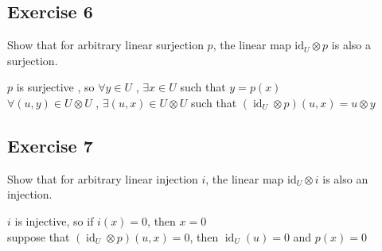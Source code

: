 \documentclass[11pt]{ctexart}
\theoremstyle{definition}
\numberwithin{equation}{section}
\newcommand{\op}[1]{\operatorname{#1}}%
\theoremstyle{definition}
\theoremstyle{remark}
\begin{document}
\begin{aaa}
                                                                                                                                                                                                                                                                                                                                                                                                                                                                                                                                                                                                                                                                                                            
\end{aaa}
\subsection{Exercise 6}
Show that for arbitrary linear surjection $p$, the linear map $\mathrm{id}_U \otimes p$ is also a surjection.
\begin{aaa}
    $p$ is surjective , so $\forall y\in U$ , $\exists x\in U$ such that $y=p(x)$\\
    $\forall (u,y)\in U\otimes U$ , $\exists (u,x) \in U\otimes U$ such that $(\op{id}_U\otimes p)(u,x)= u\otimes y$ 

\end{aaa}
\subsection{Exercise 7}
Show that for arbitrary linear injection $i$, the linear map $\mathrm{id}_U \otimes i$ is also an injection.
\begin{aaa}
    $i$ is injective, so if $i(x)=0$, then $x=0$\\
    suppose that $(\op{id}_U\otimes p)(u,x)=0$, then $\op{id}_U(u)=0$ and $p(x)=0$\\
\end{aaa}
\end{document}
